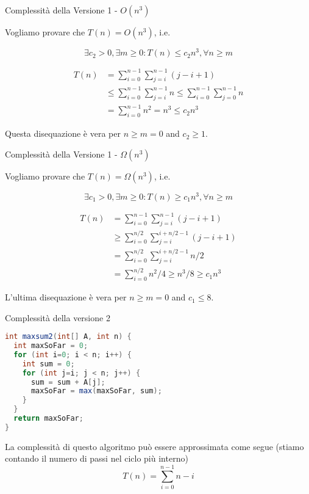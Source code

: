 \begin{frame}{Complessità della Versione 1 - $O(n^3)$}

Vogliamo provare che  $T(n) = O(n^3)$, i.e.

\[
  \exists c_2 > 0, \exists m \geq 0: T(n) \leq c_2 n^3, \forall n \geq m
\]

\vspace{-12pt}
\begin{align*}
T(n) &= \sum_{i=0}^{n-1} \sum_{j=i}^{n-1} (j-i+1) \\
     &\leq \sum_{i=0}^{n-1} \sum_{j=i}^{n-1} n 
     \leq \sum_{i=0}^{n-1} \sum_{j=0}^{n-1} n \\
     &= \sum_{i=0}^{n-1} n^2 
     = n^3 \leq c_2n^3
\end{align*}

Questa disequazione è vera per $n \geq m = 0$ and $c_2 \geq 1$.

\end{frame}

\begin{frame}{Complessità della Versione 1 - $\Omega(n^3)$}

\small
Vogliamo provare che  $T(n) = \Omega(n^3)$, i.e.

\[
  \exists c_1 > 0, \exists m \geq 0:  T(n) \geq c_1 n^3, \forall n \geq m
\]

\vspace{-12pt}
\begin{align*}
T(n) &= \sum_{i=0}^{n-1} \sum_{j=i}^{n-1} (j-i+1) \\
     &\geq \sum_{i=0}^{n/2} \sum_{j=i}^{i+n/2-1} (j-i+1) \\ 
     &= \sum_{i=0}^{n/2} \sum_{j=i}^{i+n/2-1} n/2 \\ 
     &= \sum_{i=0}^{n/2} n^2/4 \geq n^3/8 \geq c_1 n^3 
\end{align*}

L'ultima disequazione è vera per $n \geq m = 0$ and $c_1 \leq 8$.

\end{frame}

\begin{frame}[fragile]{Complessità della versione 2}

\vspace{-18pt}
\begingroup
\small
\begin{lstlisting}[language=java]
int maxsum2(int[] A, int n) {
  int maxSoFar = 0;
  for (int i=0; i < n; i++) {
    int sum = 0;
    for (int j=i; j < n; j++) {
      sum = sum + A[j];
      maxSoFar = max(maxSoFar, sum);
    }
  }
  return maxSoFar;
}
\end{lstlisting}  
\endgroup

La complessità di questo algoritmo può essere approssimata come segue (stiamo contando il numero di passi nel ciclo più interno)
\[
T(n) = \sum_{i=0}^{n-1} n-i
\]


\end{frame}

